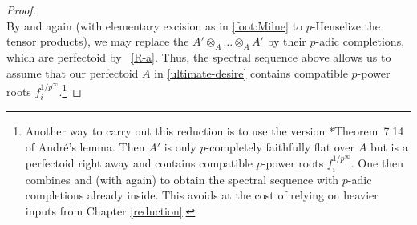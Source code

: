 \begin{proof}
\[\]
By  and  again (with elementary excision as in \cref{foot:Milne} to $p$-Henselize the tensor products),  we may replace the $A'\otimes_A \ldots\otimes_A A'$ by their $p$-adic completions, which are perfectoid by ~\ref{R-a}. Thus, the spectral sequence above allows us to assume that our perfectoid $A$ in \eqref{ultimate-desire} contains compatible $p$-power roots $f_i^{1/p^\infty}$.\footnote{Another way to carry out this reduction is to use the version \cite{BS19}*{Theorem~7.14%
} of Andr\'{e}'s lemma. Then $A'$ is only $p$-completely faithfully flat over $A$ but is a perfectoid right away and contains compatible $p$-power roots $f_i^{1/p^\infty}$. One then combines  and  (with  again) to obtain the spectral sequence with $p$-adic completions already inside. This avoids  at the cost of relying on heavier inputs from Chapter \ref{reduction}.} %


\end{proof}
